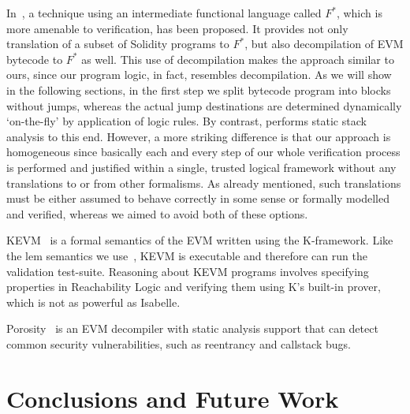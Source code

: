 \documentclass[sigplan,10pt,review]{acmart}\settopmatter{printfolios=true,printccs=false,printacmref=false}
\begin{document}
In~\cite{Bhargavan:2016:FVS:2993600.2993611}, a technique using an intermediate functional language
called $F^*$, which is more amenable to verification, has been proposed. 
It provides not only translation of a subset of Solidity programs 
to $F^*$, but also decompilation of EVM bytecode to $F^*$ as well. This use of decompilation makes
the approach similar to ours, since our program logic, in fact, resembles decompilation.
As we will show in the following sections, in the first step we split bytecode program into blocks without jumps,  
whereas the actual jump destinations are determined dynamically `on-the-fly' by application of logic rules.
By contrast, \cite{Bhargavan:2016:FVS:2993600.2993611} performs static stack analysis to this end.
However, a more striking difference is that our approach is homogeneous since basically each and every step of our whole verification process 
is performed and justified within a single, trusted logical framework without any translations to or from other formalisms.
As already mentioned, such translations must be either assumed to behave correctly in some sense or 
formally modelled and verified,
whereas we aimed to avoid both of these options. 

KEVM~\cite{Hildenbrandt_SZRDGR_17} is a formal semantics of the EVM written using the K-framework.
Like the lem semantics we use~\cite{Yoichi}, KEVM is executable and therefore can run the validation test-suite.
Reasoning about KEVM programs involves specifying properties in Reachability Logic and
verifying them using K's built-in prover, which is not as powerful as Isabelle.

Porosity~\cite{Msuiche_17} is an EVM decompiler with static analysis support that can detect common
security vulnerabilities, such as reentrancy and callstack bugs.


\section{Conclusions and Future Work}
\label{sec:concl}






\end{document}
